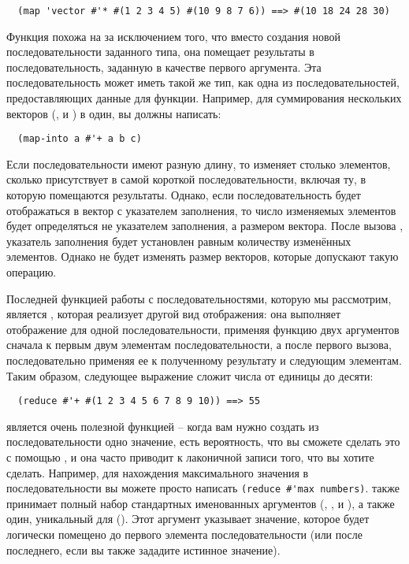 \begin{verbatim}
  (map 'vector #'* #(1 2 3 4 5) #(10 9 8 7 6)) ==> #(10 18 24 28 30)
\end{verbatim}

Функция  похожа на  за исключением того, что вместо создания
новой последовательности заданного типа, она помещает результаты в последовательность,
заданную в качестве первого аргумента.  Эта последовательность может иметь такой же тип,
как одна из последовательностей, предоставляющих данные для функции.  Например, для
суммирования нескольких векторов (,  и ) в один, вы должны
написать:

\begin{verbatim}
  (map-into a #'+ a b c)
\end{verbatim}

Если последовательности имеют разную длину, то  изменяет столько элементов,
сколько присутствует в самой короткой последовательности, включая ту, в которую помещаются
результаты.  Однако, если последовательность будет отображаться в вектор с указателем
заполнения, то число изменяемых элементов будет определяться не указателем заполнения, а
размером вектора.  После вызова , указатель заполнения будет установлен
равным количеству изменённых элементов. Однако  не будет изменять размер
векторов, которые допускают такую операцию.

Последней функцией работы с последовательностями, которую мы рассмотрим, является
, которая реализует другой вид отображения: она выполняет отображение для
одной последовательности, применяя функцию двух аргументов сначала к первым двум элементам
последовательности, а после первого вызова, последовательно применяя ее к полученному
результату и следующим элементам.  Таким образом, следующее выражение сложит числа от
единицы до десяти:

\begin{verbatim}
  (reduce #'+ #(1 2 3 4 5 6 7 8 9 10)) ==> 55
\end{verbatim}

 является очень полезной функцией -- когда вам нужно создать из
последовательности одно значение, есть вероятность, что вы сможете сделать это с помощью
, и она часто приводит к лаконичной записи того, что вы хотите сделать.
Например, для нахождения максимального значения в последовательности вы можете просто
написать \lstinline!(reduce #'max numbers)!.  также принимает полный набор
стандартных именованных аргументов (, ,  и
), а также один, уникальный для  ().  Этот
аргумент указывает значение, которое будет логически помещено до первого элемента
последовательности (или после последнего, если вы также зададите  истинное
значение).

